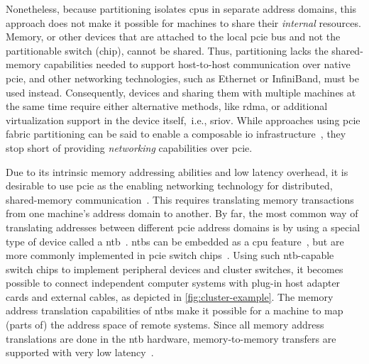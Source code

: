 Nonetheless, because partitioning isolates \glspl{cpu} in separate address domains, this approach does not make it possible for machines to share their \emph{internal} resources.
%
Memory, or other devices that are attached to the local \gls{pcie} bus and not the partitionable switch (chip), cannot be shared.
%
Thus, partitioning lacks the shared-memory capabilities needed to support host-to-host communication over native \gls{pcie}, and other networking technologies, such as Ethernet or InfiniBand, must be used instead.
%
Consequently,  devices and sharing them with multiple machines at the same time require either alternative methods, like \gls{rdma}, or additional virtualization support in the device itself,~i.e., \gls{sriov}.
%
While approaches using \gls{pcie} fabric partitioning can be said to enable a composable \gls{io} infrastructure~\cite{Chung2018}, they stop short of providing \emph{networking} capabilities over \gls{pcie}.



Due to its intrinsic memory addressing abilities and low latency overhead, it is desirable to use \gls{pcie} as the enabling networking technology for distributed, shared-memory communication~\cite{Shim2018,whitepaper:Regula2004,url:Meduri2011}.
%
This requires translating memory transactions from one machine's address domain to another.
%
By far, the most common way of translating addresses between different \gls{pcie} address domains is by using a special type of device called a \gls{ntb}~\cite{whitepaper:PLX,whitepaper:Regula2004,Hou2013,Tu2014}.
%
\Glspl{ntb} can be embedded as a \gls{cpu} feature~\cite{whitepaper:Sullivan2010,url:LinuxNTB-AMD}, but are more commonly implemented in \gls{pcie} switch chips~\cite{whitepaper:PLX,pex8733}.
%
Using such \gls{ntb}-capable switch chips to implement peripheral devices and cluster switches, it becomes possible to connect independent computer systems with plug-in host adapter cards and external cables, as depicted in \cref{fig:cluster-example}.
%
The memory address translation capabilities of \glspl{ntb} make it possible for a machine to map (parts of) the address space of remote systems.
%
Since all memory address translations are done in the \gls{ntb} hardware, memory-to-memory transfers are supported with very low latency~\cite{Lim2019,Tu2014}.



